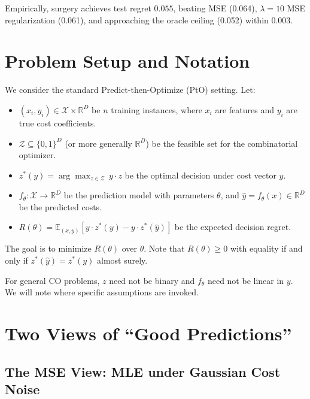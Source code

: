\documentclass[11pt]{article}
\begin{document}
Empirically, surgery achieves test regret $\mathbf{0.055}$, beating MSE (0.064),
$\lambda=10$ MSE regularization (0.061), and approaching the oracle ceiling
(0.052) within 0.003.

\section{Problem Setup and Notation}

We consider the standard Predict-then-Optimize (PtO) setting.  Let:
\begin{itemize}[itemsep=2pt]
  \item $(x_i, y_i) \in \mathcal{X} \times \mathbb{R}^D$ be $n$ training
        instances, where $x_i$ are features and $y_i$ are true cost coefficients.
  \item $\mathcal{Z} \subseteq \{0,1\}^D$ (or more generally $\mathbb{R}^D$) be
        the feasible set for the combinatorial optimizer.
  \item $z^*(y) = \arg\max_{z \in \mathcal{Z}}\, y \cdot z$ be the optimal
        decision under cost vector $y$.
  \item $f_\theta : \mathcal{X} \to \mathbb{R}^D$ be the prediction model with
        parameters $\theta$, and $\hat{y} = f_\theta(x) \in \mathbb{R}^D$ be
        the predicted costs.
  \item $R(\theta) = \mathbb{E}_{(x,y)}\!\left[y \cdot z^*(y) -
        y \cdot z^*(\hat{y})\right]$ be the expected decision regret.
\end{itemize}

The goal is to minimize $R(\theta)$ over $\theta$.  Note that $R(\theta) \geq 0$
with equality if and only if $z^*(\hat{y}) = z^*(y)$ almost surely.

For general CO problems, $z$ need not be binary and $f_\theta$ need not be
linear in $y$.  We will note where specific assumptions are invoked.

\section{Two Views of ``Good Predictions''}

\subsection{The MSE View: MLE under Gaussian Cost Noise}
\end{document}
